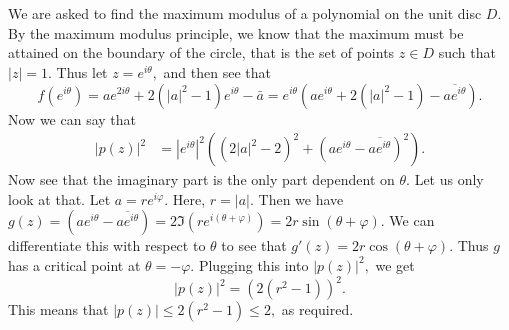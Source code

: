 \documentclass{article}
\begin{document}
\section{} %
We are asked to find the maximum modulus of a polynomial on the unit disc $D.$ By the maximum modulus principle, we know that the maximum must be attained 
on the boundary of the circle, that is the set of points $z \in D$ such that $|z|=1.$ Thus let $z=e^{i\theta},$ and then see that $$f(e^{i\theta})= 
ae^{2i\theta} + 2(|a|^2-1)e^{i\theta} -\bar{a}= e^{i\theta} \left( ae^{i\theta} + 2(|a|^2-1) -\overline{ae^{i\theta}} \right).$$ 
Now we can say that 
\begin{align*}
	|p(z)|^2 &= |e^{i\theta}|^2 \left(\left(2|a|^2-2\right)^2+ \left( ae^{i\theta}-\overline{ae^{i\theta}} \right)^2 \right).
\end{align*}
Now see that the imaginary part is the only part dependent on $\theta.$ Let us only look at that. Let $a= re^{i\varphi}.$ Here, $r=|a|.$ Then we have 
$g(z)= \left( ae^{i\theta}-\overline{ae^{i\theta}} \right)= 2 \Im\left(re^{i(\theta + \varphi)}\right)= 2r \sin (\theta + \varphi).$ We can differentiate 
this with respect to $\theta$ to see that $g'(z)= 2r \cos(\theta + \varphi).$ Thus $g$ has a critical point at $\theta= - \varphi.$ Plugging this into 
$|p(z)|^2,$ we get $$	|p(z)|^2 = \left(2(r^2-1)\right)^2 .$$ This means that $|p(z)| \leq 2(r^2-1) \leq 2,$ as required.
\end{document}
